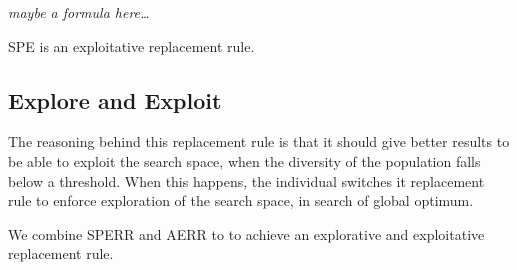 \emph{maybe a formula here\dots}

SPE is an exploitative replacement rule.

\subsection{Explore and Exploit}

The reasoning behind this replacement rule is that it should give better results to be able to exploit the search space, when the diversity of the population falls below a threshold. When this happens, the individual switches it replacement rule to enforce exploration of the search space, in search of global optimum.

We combine SPERR and AERR to to achieve an explorative and exploitative replacement rule.
